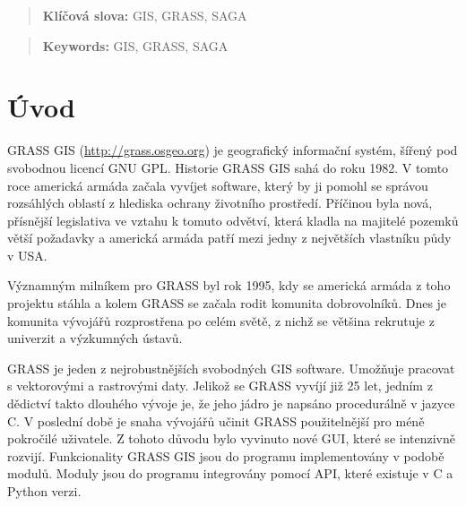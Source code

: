 \documentclass[a4paper,12pt]{article}
\author{Štěpán Turek}
\newcommand{\klicslova}[2]{\noindent\textbf{#1: }#2}
\newcommand{\necislovana}[1]{%
\phantomsection
\addcontentsline{toc}{section}{#1}
\section*{#1}
\markboth{\uppercase{#1}}{}
}
\begin{document}
\pagestyle{empty}


\newpage





\begin{abstract}

\bigskip

\klicslova{Klíčová slova}{GIS, GRASS, SAGA}

\end{abstract}

\begin{abstract}

\bigskip

\klicslova{Keywords}{GIS, GRASS, SAGA}

\end{abstract}


\newpage

\newpage
\tableofcontents


\newpage
\pagestyle{fancy}

\necislovana{Úvod}

GRASS GIS (\url{http://grass.osgeo.org}) je geografický informační
systém, šířený pod svobodnou licencí GNU GPL.  Historie GRASS GIS sahá
do roku 1982. V tomto roce americká armáda začala vyvíjet software,
který by ji pomohl se správou rozsáhlých oblastí z hlediska ochrany
životního prostředí. Příčinou byla nová, přísnější legislativa ve
vztahu k tomuto odvětví, která kladla na majitelé pozemků větší
požadavky a americká armáda patří mezi jedny z největších vlastníku
půdy v USA.
 
Významným milníkem pro GRASS byl rok 1995, kdy se americká armáda z
toho projektu stáhla a kolem GRASS se začala rodit komunita
dobrovolníků.  Dnes je komunita vývojářů rozprostřena po celém světě,
z nichž se většina rekrutuje z univerzit a výzkumných ústavů.

GRASS je jeden z nejrobustnějších svobodných GIS software. Umožňuje
pracovat s vektorovými a rastrovými daty.  Jelikož se GRASS vyvíjí již
25 let, jedním z dědictví takto dlouhého vývoje je, že jeho jádro je
napsáno procedurálně v jazyce C.  V poslední době je snaha vývojářů
učinit GRASS použitelnější pro méně pokročilé uživatele. Z tohoto
důvodu bylo vyvinuto nové GUI, které se intenzivně rozvijí.
Funkcionality GRASS GIS jsou do programu implementovány v podobě
modulů. Moduly jsou do programu integrovány pomocí API, které existuje
v C a Python verzi.
\end{document}

